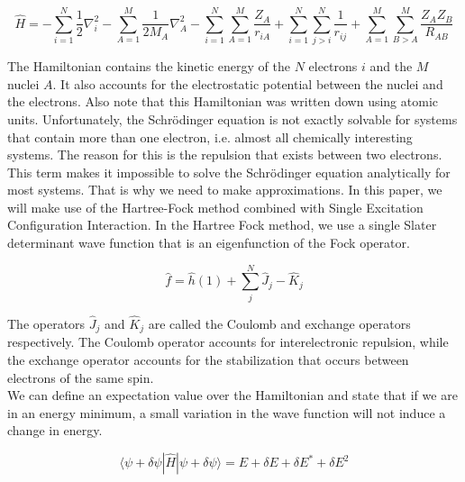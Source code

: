 \documentclass[twoside,twocolumn,9pt]{article}
\begin{document}
\begin{equation}\label{eq:ham}
  \hat{H} = -\sum_{i=1}^N\frac{1}{2}\nabla^2_i - \sum_{A=1}^M \frac{1}{2M_A}\nabla^2_A - \sum_{i=1}^N\sum_{A=1}^M\frac{Z_A}{r_{iA}} + \sum_{i=1}^N\sum_{j>i}^N\frac{1}{r_{ij}} +
  \sum_{A=1}^M\sum_{B>A}^M\frac{Z_A Z_B}{R_{AB}}
\end{equation}

The Hamiltonian contains the kinetic energy of the $N$ electrons $i$ and the $M$ nuclei $A$. It also accounts for the electrostatic potential between the nuclei and the electrons.
Also note that this Hamiltonian was written down using atomic units. Unfortunately, the Schrödinger equation is not exactly solvable for systems that contain more than one electron, i.e.
almost all chemically interesting systems. The reason for this is the repulsion that exists between two electrons. This term makes it impossible to solve the Schrödinger equation
analytically for most systems. That is why we need to make approximations. In this paper, we will make use of the Hartree-Fock method
combined with Single Excitation Configuration Interaction. In the Hartree Fock method, we use a single Slater determinant wave function that is an eigenfunction of the Fock
operator\cite{Szabo1996}.

\begin{equation}
  \hat{f} = \hat{h}(1) +  \sum_j^N \hat{J}_j - \hat{K}_j
\end{equation}

The operators $\hat{J}_j$ and $\hat{K}_j$ are called the Coulomb and exchange operators respectively. The Coulomb operator accounts for interelectronic repulsion, while the exchange
operator accounts for the stabilization that occurs between electrons of the same spin. \\

We can define an expectation value over the Hamiltonian and state that if we are in an energy minimum, a small variation in the wave function will not induce a change
in energy.

\begin{equation}\label{eq:hamexp}
  \langle\psi + \delta\psi|\hat{H}|\psi + \delta\psi \rangle = E + \delta E + \delta E^* + \delta E^2
\end{equation}
\end{document}
